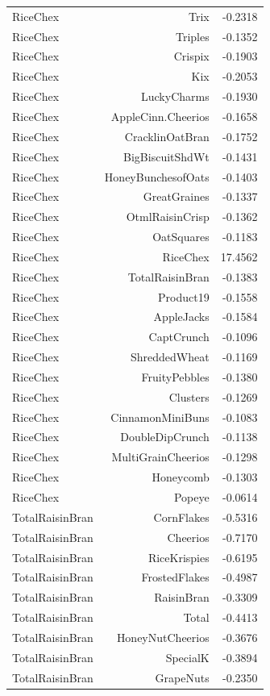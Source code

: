 \begin{longtable}{@{}lrr@{}}
RiceChex & Trix & -0.2318 \\
RiceChex & Triples & -0.1352 \\
RiceChex & Crispix & -0.1903 \\
RiceChex & Kix & -0.2053 \\
RiceChex & LuckyCharms & -0.1930 \\
RiceChex & AppleCinn.Cheerios & -0.1658 \\
RiceChex & CracklinOatBran & -0.1752 \\
RiceChex & BigBiscuitShdWt & -0.1431 \\
RiceChex & HoneyBunchesofOats & -0.1403 \\
RiceChex & GreatGraines & -0.1337 \\
RiceChex & OtmlRaisinCrisp & -0.1362 \\
RiceChex & OatSquares & -0.1183 \\
RiceChex & RiceChex & 17.4562 \\
RiceChex & TotalRaisinBran & -0.1383 \\
RiceChex & Product19 & -0.1558 \\
RiceChex & AppleJacks & -0.1584 \\
RiceChex & CaptCrunch & -0.1096 \\
RiceChex & ShreddedWheat & -0.1169 \\
RiceChex & FruityPebbles & -0.1380 \\
RiceChex & Clusters & -0.1269 \\
RiceChex & CinnamonMiniBuns & -0.1083 \\
RiceChex & DoubleDipCrunch & -0.1138 \\
RiceChex & MultiGrainCheerios & -0.1298 \\
RiceChex & Honeycomb & -0.1303 \\
RiceChex & Popeye & -0.0614 \\
TotalRaisinBran & CornFlakes & -0.5316 \\
TotalRaisinBran & Cheerios & -0.7170 \\
TotalRaisinBran & RiceKrispies & -0.6195 \\
TotalRaisinBran & FrostedFlakes & -0.4987 \\
TotalRaisinBran & RaisinBran & -0.3309 \\
TotalRaisinBran & Total & -0.4413 \\
TotalRaisinBran & HoneyNutCheerios & -0.3676 \\
TotalRaisinBran & SpecialK & -0.3894 \\
TotalRaisinBran & GrapeNuts & -0.2350 \\

\end{longtable}
